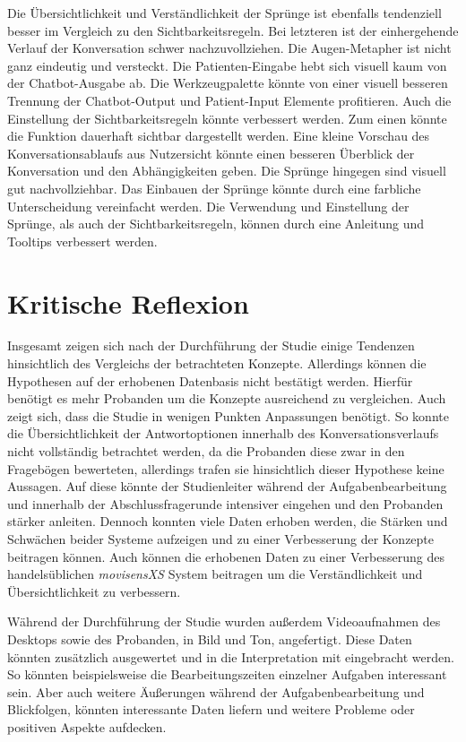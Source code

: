 Die Übersichtlichkeit und Verständlichkeit der Sprünge ist ebenfalls tendenziell besser im Vergleich zu den Sichtbarkeitsregeln. Bei letzteren ist der einhergehende Verlauf der Konversation schwer nachzuvollziehen. Die Augen-Metapher ist nicht ganz eindeutig und versteckt. Die Patienten-Eingabe hebt sich visuell kaum von der Chatbot-Ausgabe ab. Die Werkzeugpalette könnte von einer visuell besseren Trennung der Chatbot-Output und Patient-Input Elemente profitieren. Auch die Einstellung der Sichtbarkeitsregeln könnte verbessert werden. Zum einen könnte die Funktion dauerhaft sichtbar dargestellt werden. Eine kleine Vorschau des Konversationsablaufs aus Nutzersicht könnte einen besseren Überblick der Konversation und den Abhängigkeiten geben. Die Sprünge hingegen sind visuell gut nachvollziehbar. Das Einbauen der Sprünge könnte durch eine farbliche Unterscheidung vereinfacht werden. Die Verwendung und Einstellung der Sprünge, als auch der Sichtbarkeitsregeln, können durch eine Anleitung und Tooltips verbessert werden.


\section{Kritische Reflexion}
Insgesamt zeigen sich nach der Durchführung der Studie einige Tendenzen hinsichtlich des Vergleichs der betrachteten Konzepte. Allerdings können die Hypothesen auf der erhobenen Datenbasis nicht bestätigt werden. Hierfür benötigt es mehr Probanden um die Konzepte ausreichend zu vergleichen. Auch zeigt sich, dass die Studie in wenigen Punkten Anpassungen benötigt. So konnte die Übersichtlichkeit der Antwortoptionen innerhalb des Konversationsverlaufs nicht vollständig betrachtet werden, da die Probanden diese zwar in den Fragebögen bewerteten, allerdings trafen sie hinsichtlich dieser Hypothese keine Aussagen. Auf diese könnte der Studienleiter während der Aufgabenbearbeitung und innerhalb der Abschlussfragerunde intensiver eingehen und den Probanden stärker anleiten. Dennoch konnten viele Daten erhoben werden, die Stärken und Schwächen beider Systeme aufzeigen und zu einer Verbesserung der Konzepte beitragen können. Auch können die erhobenen Daten zu einer Verbesserung des handelsüblichen \emph{movisensXS} System beitragen um die Verständlichkeit und Übersichtlichkeit zu verbessern. 

Während der Durchführung der Studie wurden außerdem Videoaufnahmen des Desktops sowie des Probanden, in Bild und Ton, angefertigt. Diese Daten könnten zusätzlich ausgewertet und in die Interpretation mit eingebracht werden. So könnten beispielsweise die Bearbeitungszeiten einzelner Aufgaben interessant sein. Aber auch weitere Äußerungen während der Aufgabenbearbeitung und Blickfolgen, könnten interessante Daten liefern und weitere Probleme oder positiven Aspekte aufdecken.

